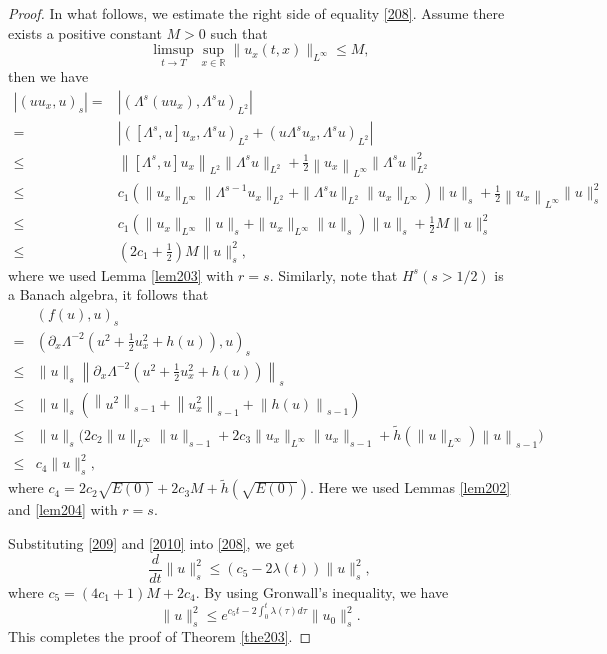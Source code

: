 \documentclass[preprint,12pt]{elsarticle}
\numberwithin{equation}{section}
\begin{document}
\begin{proof}
In what follows, we estimate the right side of equality \eqref{208}. Assume there exists a positive constant $M>0$ such that
$$
\limsup_{t\rightarrow T}\sup_{x\in\mathbb{R}}\|{u_{x}(t,x)}\|_{L^{\infty}}\leq M,
$$
then we have
\begin{align}
|(uu_{x},u)_{s}|
=&|(\Lambda^{s}(uu_{x}),\Lambda^{s}u)_{L^{2}}|\nonumber\\
=&\left|\left([\Lambda^{s},u]u_{x},\Lambda^{s}u\right)_{L^{2}}
+\left(u\Lambda^{s}u_{x},\Lambda^{s}u\right)_{L^{2}}\right|\nonumber\\
\leq&\left\|[\Lambda^{s},u]u_{x}\right\|_{L^{2}}\|\Lambda^{s}u\|_{L^{2}}
+\frac{1}{2}\left\|u_{x}\right\|_{L^{\infty}}\|\Lambda^{s}u\|^{2}_{L^{2}}\nonumber\\
\leq& c_{1}\left(\|u_{x}\|_{L^{\infty}}\|\Lambda^{s-1}u_{x}\|_{L^{2}}
+\|\Lambda^{s}u\|_{L^{2}}\|u_{x}\|_{L^{\infty}}\right)\|u\|_{s}+\frac{1}{2}\left\|u_{x}\right\|_{L^{\infty}}\|u\|_{s}^{2}\nonumber\\
\leq& c_{1}\left(\|u_{x}\|_{L^{\infty}}\|u\|_{s}
+\|u_{x}\|_{L^{\infty}}\|u\|_{s}\right)\|u\|_{s}+\frac{1}{2}M\|u\|_{s}^{2}\nonumber\\
\leq&\left(2c_{1}+\frac{1}{2}\right)M\|u\|_{s}^{2},
\label{209}
\end{align}
where we used Lemma \ref{lem203} with $r=s$.
Similarly, note that $H^{s}(s>1/2)$ is a Banach algebra, it follows that
\begin{align}
&(f(u),u)_{s}\nonumber\\
=&\left(\partial_{x}\Lambda^{-2}\left(u^{2}+\frac{1}{2}u_{x}^{2}+h(u)\right),u\right)_{s}\nonumber\\
\leq& \|u\|_{s}\left\|\partial_{x}\Lambda^{-2}\left(u^{2}+\frac{1}{2}u_{x}^{2}+h(u)\right)\right\|_{s}
\nonumber\\
\leq& \|u\|_{s}\left(\left\|u^{2}\right\|_{s-1}+\left\|u_{x}^{2}\right\|_{s-1}+\left\|h(u)\right\|_{s-1}
\right)\nonumber\\
\leq& \|u\|_{s}\bigg(2c_{2}\|u\|_{L^{\infty}}\|u\|_{s-1}+2c_{3}\|u_{x}\|_{L^{\infty}}\|u_{x}\|_{s-1}
+\widetilde{h}(\|u\|_{L^{\infty}})\left\|u\right\|_{s-1}
\bigg)\nonumber\\
\leq&c_{4}\|u\|_{s}^{2},
\label{2010}
\end{align}
where $c_{4}=2c_{2}\sqrt{E(0)}+2c_{3}M+\widetilde{h}(\sqrt{E(0)}).$
Here we used Lemmas \ref{lem202} and \ref{lem204} with $r=s$.

Substituting \eqref{209} and \eqref{2010} into \eqref{208}, we get
\begin{equation}
\frac{d}{dt}\|u\|_{s}^{2}\leq \left(c_{5}-2\lambda(t)\right)\|u\|_{s}^{2},
\label{2011}
\end{equation}
where $c_{5}=\left(4c_{1}+1\right)M+2c_{4}.$
By using Gronwall's inequality, we have
$$\|u\|_{s}^{2}\leq e^{c_{5}t-2\int_{0}^{t}\lambda(\tau)d\tau}\|u_{0}\|_{s}^{2}.$$
This completes the proof of Theorem \ref{the203}.
\end{proof}
\end{document}
